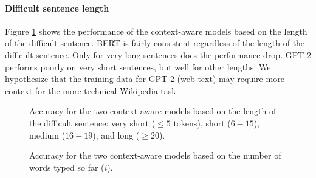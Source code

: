 \documentclass[11pt,a4paper]{article}
\begin{document}
\vspace{-1mm}
\paragraph{Difficult sentence length} Figure \ref{fig:length_based} shows the performance of the context-aware models based on the length of the difficult sentence.  BERT is fairly consistent regardless of the length of the difficult sentence.  Only for very long sentences does the performance drop.  GPT-2 performs poorly on very short sentences, but well for other lengths.  We hypothesize that the training data for GPT-2 (web text) may require more context for the more technical Wikipedia task. 

\begin{figure}[t]
\caption{\footnotesize \label{fig:length_based} Accuracy for the two context-aware models based on the length of the difficult sentence: very short ($\le 5$ tokens), short ($6-15$), medium ($16-19$), and long ($\ge20$).}
\vspace{-2mm}
\end{figure}

\begin{figure}[t]
\caption{Accuracy for the two context-aware models based on the number of words typed so far ($i$).}
\label{fig:position_based}
\vspace{-2mm}
\end{figure}
\end{document}
